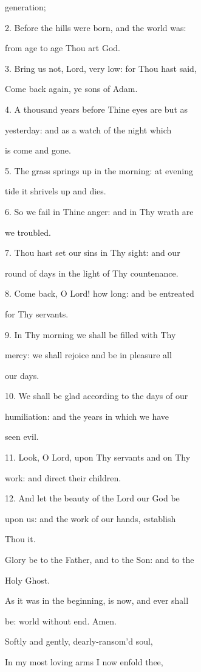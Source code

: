 generation;

2. Before the hills were born, and the world was:

from age to age Thou art
God.

3. Bring us not, Lord, very low: for Thou hast said,

Come back again, ye sons
of Adam.

4. A thousand years before Thine eyes are but as

yesterday: and as a watch
of the night which

is come and gone.

5. The grass springs up in the morning: at evening

tide it shrivels up and
dies.

6. So we fail in Thine anger: and in Thy wrath are

we troubled.

7. Thou hast set our sins in Thy sight: and our

round of days in the
light of Thy countenance.

8. Come back, O Lord! how long: and be entreated

for Thy servants.

9. In Thy morning we shall be filled with Thy

mercy: we shall rejoice
and be in pleasure all

our days. 

10. We shall be glad according to the days of our

humiliation: and the
years in which we have

seen evil.

11. Look, O Lord, upon Thy servants and on Thy

work: and direct their
children.

12. And let the beauty of the Lord our God be

upon us: and the work of
our hands, establish

Thou it.

Glory be to the Father, and to the Son: and to the

Holy Ghost.

As it was in the beginning, is now, and ever shall

be: world without end.
Amen.


Softly and gently, dearly-ransom'd soul,

In my most loving arms I
now enfold thee,

